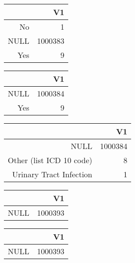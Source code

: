 \bigskip\bigskip
\centering
\begin{tabular}{rr}
  \hline
 & V1 \\ 
  \hline
No &   1 \\ 
  NULL & 1000383 \\ 
  Yes &   9 \\ 
   \hline
\end{tabular}

\bigskip\bigskip
\centering
\begin{tabular}{rr}
  \hline
 & V1 \\ 
  \hline
NULL & 1000384 \\ 
  Yes &   9 \\ 
   \hline
\end{tabular}

\bigskip\bigskip
\centering
\begin{tabular}{rr}
  \hline
 & V1 \\ 
  \hline
NULL & 1000384 \\ 
  Other (list ICD 10 code) &   8 \\ 
  Urinary Tract Infection &   1 \\ 
   \hline
\end{tabular}

\bigskip\bigskip
\centering
\begin{tabular}{rr}
  \hline
 & V1 \\ 
  \hline
NULL & 1000393 \\ 
   \hline
\end{tabular}

\bigskip\bigskip
\centering
\begin{tabular}{rr}
  \hline
 & V1 \\ 
  \hline
NULL & 1000393 \\ 
   \hline
\end{tabular}

